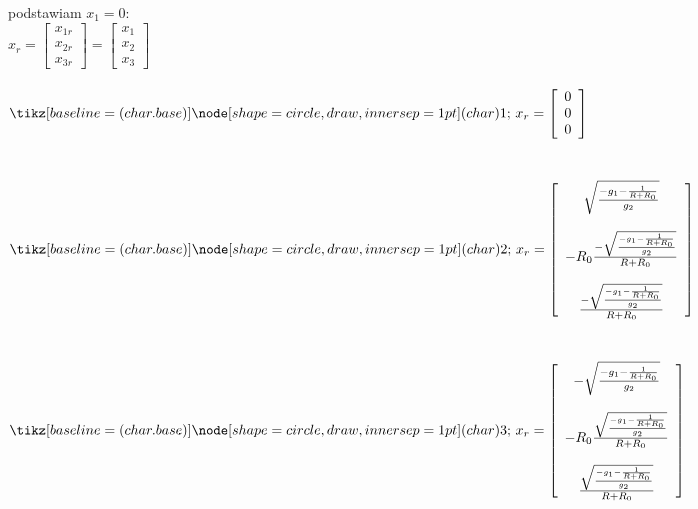 podstawiam $x_1=0$:\\
$x_r=\left[ \begin{array}{c}   x_{1r}\\ x_{2r}\\x_{3r}   \end{array}\right]
=\left[ \begin{array}{c}   x_{1}\\ x_{2}\\x_{3}   \end{array}\right]$\\\\
$\circled{1} \ x_r=\left[ \begin{array}{c}   0\\0\\0   \end{array}\right]$\\\\\\
$\circled{2} \ x_r=\left[ \begin{array}{c}   
	\sqrt{\frac{-g_1-\frac{1}{R+R_0}}{g_2}}\\
\\
	-R_0\frac{-\sqrt{\frac{-g_1-\frac{1}{R+R_0}}{g_2}}}{R+R_0}   \\
\\
	\frac{-\sqrt{\frac{-g_1-\frac{1}{R+R_0}}{g_2}}}{R+R_0}
\end{array}\right]$\\\\\\
$\circled{3} \ x_r=\left[ \begin{array}{c}   
	-\sqrt{\frac{-g_1-\frac{1}{R+R_0}}{g_2}}\\
\\
	-R_0\frac{\sqrt{\frac{-g_1-\frac{1}{R+R_0}}{g_2}}}{R+R_0}   \\
\\
	\frac{\sqrt{\frac{-g_1-\frac{1}{R+R_0}}{g_2}}}{R+R_0}
\end{array}\right]$



\pagebreak
